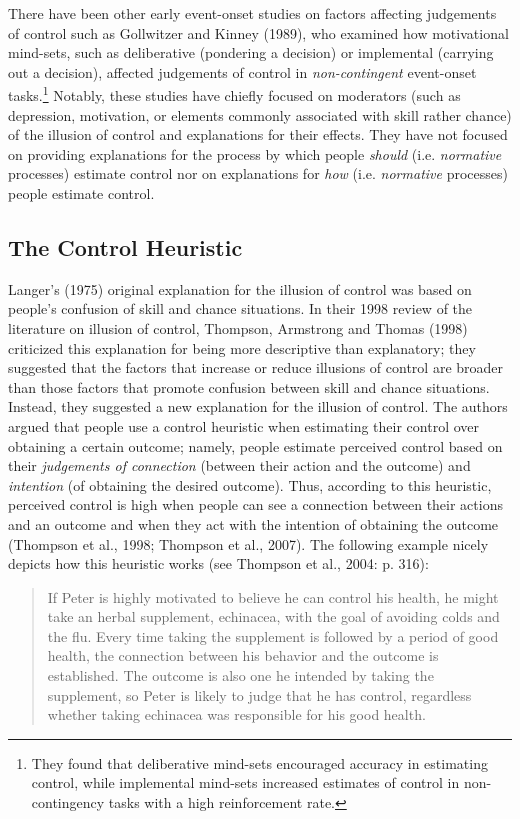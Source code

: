 \documentclass[USenglish,letterpaper,12pt,extrafontsizes,oneside,onecolumn,final]{memoir}
\begin{document}
There have been other early event-onset studies on factors affecting judgements of control such as Gollwitzer and Kinney (1989), who examined how motivational mind-sets, such as deliberative (pondering a decision) or implemental (carrying out a decision), affected judgements of control in \emph{non-contingent} event-onset tasks.\footnote{They found that deliberative mind-sets encouraged accuracy in estimating control, while implemental mind-sets increased estimates of control in non-contingency tasks with a high reinforcement rate.} Notably, these studies have chiefly focused on moderators (such as depression, motivation, or elements commonly associated with skill rather chance) of the illusion of control and explanations for their effects.  They have not focused on providing explanations for the process by which people \emph{should} (i.e. \emph{normative} processes) estimate control nor on explanations for \emph{how} (i.e. \emph{normative} processes) people estimate control. 

\subsection{The Control Heuristic}

Langer's (1975) original explanation for the illusion of control was based on people's confusion of skill and chance situations. In their 1998 review of the literature on illusion of control, Thompson, Armstrong and Thomas (1998) criticized this explanation for being more descriptive than explanatory; they suggested that the factors that increase or reduce illusions of control are broader than those factors that promote confusion between skill and chance situations. Instead, they suggested a new explanation for the illusion of control. The authors argued that people use a control heuristic when estimating their control over obtaining a certain outcome; namely, people estimate perceived control based on their \emph{judgements of connection} (between their action and the outcome) and \emph{intention} (of obtaining the desired outcome). Thus, according to this heuristic, perceived control is high when people can see a connection between their actions and an outcome and when they act with the intention of obtaining the outcome (Thompson et al., 1998; Thompson et al., 2007). The following example nicely depicts how this heuristic works (see Thompson et al., 2004: p. 316): 

\begin{quotation}
If Peter is highly motivated to believe he can control his health, he might take an herbal supplement, echinacea, with the goal of avoiding colds and the flu. Every time taking the supplement is followed by a period of good health, the connection between his behavior and the outcome is established. The outcome is also one he intended by taking the supplement, so Peter is likely to judge that he has control, regardless whether taking echinacea was responsible for his good health.
\end{quotation}
\end{document}
